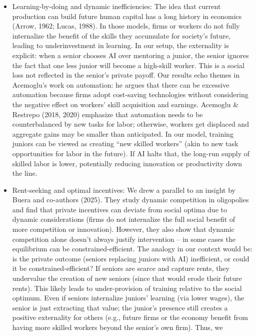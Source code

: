\documentclass[12pt]{article}
\begin{document}
\begin{itemize}
\item
  {Learning-by-doing and dynamic inefficiencies:} The idea that
  current production can build future human capital has a long history
  in economics (Arrow, 1962; Lucas, 1988). In those models, firms or
  workers do not fully internalize the benefit of the skills they
  accumulate for society's future, leading to underinvestment in
  learning. In our setup, the externality is explicit: when a senior
  chooses AI over mentoring a junior, the senior ignores the fact that
  one less junior will become a high-skill worker. This is a social loss
  not reflected in the senior's private payoff. Our results echo themes
  in Acemoglu's work on automation: he argues that there can be
  {excessive automation} because firms adopt cost-saving
  technologies without considering the negative effect on workers' skill
  acquisition and earnings. Acemoglu \& Restrepo (2018, 2020) emphasize
  that automation needs to be counterbalanced by new tasks for labor;
  otherwise, workers get displaced and aggregate gains may be smaller
  than anticipated. In our model, training juniors can be viewed as
  creating ``new skilled workers'' (akin to new task opportunities for
  labor in the future). If AI halts that, the long-run supply of skilled
  labor is lower, potentially reducing innovation or productivity down
  the line.
\item
  {Rent-seeking and optimal incentives:} We drew a parallel to an
  insight by Buera and co-authors (2025). They study dynamic competition
  in oligopolies and find that private incentives can deviate from
  social optima due to dynamic considerations (firms do not internalize
  the full social benefit of more competition or innovation). However,
  they also show that {dynamic competition alone doesn't always
  justify intervention} -- in some cases the equilibrium can be
  constrained-efficient. The analogy in our context would be: is the
  private outcome (seniors replacing juniors with AI) inefficient, or
  could it be constrained-efficient? If seniors are scarce and capture
  rents, they undervalue the creation of new seniors (since that would
  erode their future rents). This likely leads to {under-provision
  of training} relative to the social optimum. Even if seniors
  internalize juniors' learning (via lower wages), the senior is just
  extracting that value; the junior's presence still creates a positive
  externality for others (e.g., future firms or the economy benefit from
  having more skilled workers beyond the senior's own firm). Thus, we

\end{itemize}
\end{document}
